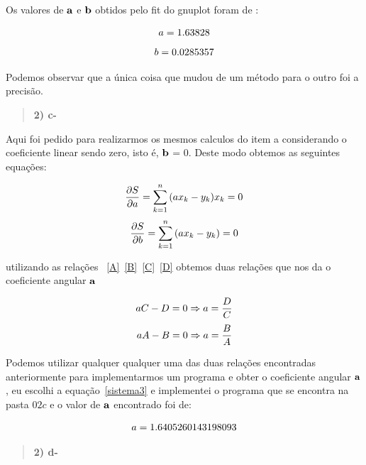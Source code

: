 \documentclass[a4wide]{report}
\begin{document}
Os valores de ${\bf a}$ e ${\bf b}$ obtidos pelo fit do gnuplot foram de :

\begin{equation}
\centering
a =   1.63828     
\label{CA}
\end{equation}
\begin{equation}
\centering   
b =   0.0285357
\label{CL}
\end{equation}

Podemos observar que a única coisa que mudou de um método para o outro foi a precisão.
\begin{quote}

\bf 2) c-

\end{quote}

Aqui foi pedido para realizarmos os mesmos calculos do item a considerando o coeficiente
linear sendo zero, isto é, ${\bf b}$ = 0. Deste modo obtemos as seguintes equações:

\begin{equation} 
\centering
\frac{\partial S}{\partial a} = \sum_{k=1}^{n}{(ax_{k} - y_{k})x_{k} = 0}
\label{deltaa2}
\end{equation}
\begin{equation}
\centering
\frac{\partial S}{\partial b} = \sum_{k=1}^{n}{(ax_{k} - y_{k}) = 0}
\label{deltab2}
\end{equation}

utilizando as relações ~\ref{A}~\ref{B}~\ref{C}~\ref{D} obtemos duas relações que nos da o coeficiente angular ${\bf a}$ 

\begin{equation}
\centering
aC - D = 0 \Rightarrow a = \frac{D}{C} 
\label{sistema3}
\end{equation}
\begin{equation}
\centering
aA - B = 0 \Rightarrow a = \frac{B}{A} 
\label{sistema4}
\end{equation}

Podemos utilizar qualquer qualquer uma das duas relações encontradas anteriormente para implementarmos
um programa e obter o coeficiente angular ${\bf a}$, eu escolhi a equação~\ref{sistema3} e implementei 
o programa que se encontra na pasta $02 c$ e o valor de ${\bf a}$ encontrado foi de:

\begin{equation}
\centering
 a =   1.6405260143198093      
\label{CA}
\end{equation}
\begin{quote}

\bf 2) d-

\end{quote}
\end{document}
